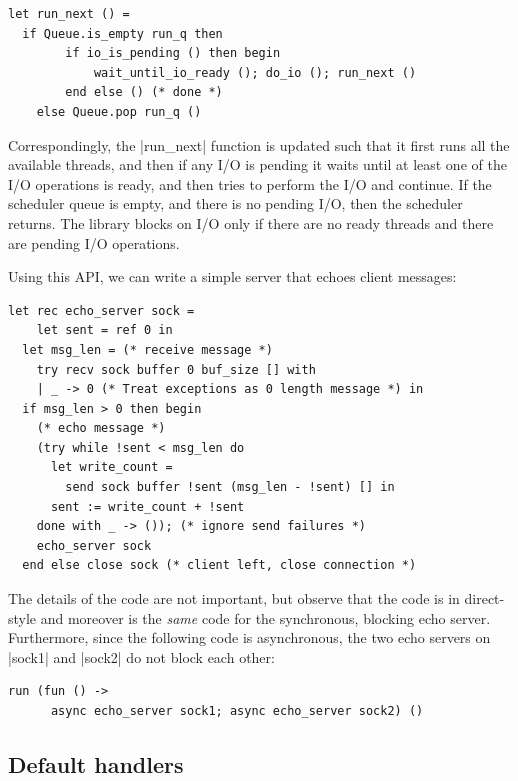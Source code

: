 \documentclass{llncs}
\begin{document}
\begin{lstlisting}
let run_next () =
  if Queue.is_empty run_q then
		if io_is_pending () then begin
			wait_until_io_ready (); do_io (); run_next ()
		end else () (* done *)
	else Queue.pop run_q ()
\end{lstlisting}

Correspondingly, the |run_next| function is updated such that it first runs all
the available threads, and then if any I/O is pending it waits until at least
one of the I/O operations is ready, and then tries to perform the I/O and
continue. If the scheduler queue is empty, and there is no pending I/O, then
the scheduler returns. The library blocks on I/O only if there are no ready
threads and there are pending I/O operations.

Using this API, we can write a simple server that echoes client messages:

\begin{lstlisting}
let rec echo_server sock =
	let sent = ref 0 in
  let msg_len = (* receive message *)
    try recv sock buffer 0 buf_size [] with
    | _ -> 0 (* Treat exceptions as 0 length message *) in
  if msg_len > 0 then begin
    (* echo message *)
    (try while !sent < msg_len do
      let write_count =
        send sock buffer !sent (msg_len - !sent) [] in
      sent := write_count + !sent
    done with _ -> ()); (* ignore send failures *)
    echo_server sock
  end else close sock (* client left, close connection *)
\end{lstlisting}

The details of the code are not important, but observe that the code is in
direct-style and moreover is the \emph{same} code for the synchronous, blocking
echo server. Furthermore, since the following code is asynchronous, the two
echo servers on |sock1| and |sock2| do not block each other:

\begin{lstlisting}
run (fun () ->
      async echo_server sock1; async echo_server sock2) ()
\end{lstlisting}

\subsection{Default handlers}
\label{sec:default-handlers}
\end{document}
